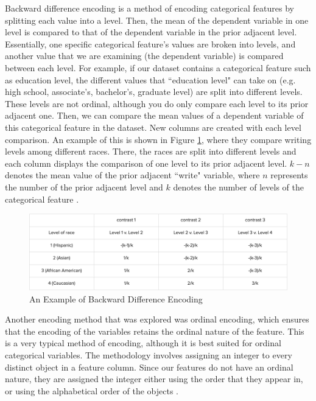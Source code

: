 \documentclass[12pt,letterpaper]{article}
\theoremstyle{plain}
\theoremstyle{definition}
\begin{document}
Backward difference encoding is a method of encoding categorical features by splitting each value into a level. Then, the mean of the dependent variable in one level is compared to that of the dependent variable in the prior adjacent level. Essentially, one specific categorical feature's values are broken into levels, and another value that we are examining (the dependent variable) is compared between each level. For example, if our dataset contains a categorical feature such as education level, the different values that ``education level" can take on (e.g. high school, associate's, bachelor's, graduate level) are split into different levels. These levels are not ordinal, although you do only compare each level to its prior adjacent one. Then, we can compare the mean values of a dependent variable of this categorical feature in the dataset. New columns are created with each level comparison. An example of this is shown in Figure \ref{fig:backward}, where they compare writing levels among different races. There, the races are split into different levels and each column displays the comparison of one level to its prior adjacent level. $k-n$ denotes the mean value of the prior adjacent ``write" variable, where $n$ represents the number of the prior adjacent level and $k$ denotes the number of levels of the categorical feature \cite{ucla}. 

\begin{figure}[h!]
    \centering
    \includegraphics[scale=0.3,center]{backward.png}
    \caption{An Example of Backward Difference Encoding}
    \label{fig:backward}
\end{figure}

Another encoding method that was explored was ordinal encoding, which ensures that the encoding of the variables retains the ordinal nature of the feature. This is a very typical method of encoding, although it is best suited for ordinal categorical variables. The methodology involves assigning an integer to every distinct object in a feature column. Since our features do not have an ordinal nature, they are assigned the integer either using the order that they appear in, or using the alphabetical order of the objects \cite{ordinal}. 
\end{document}
